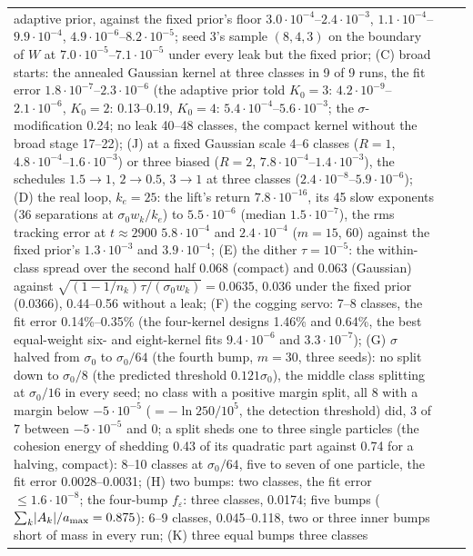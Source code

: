 {\begin{longtable}{@{}>{\raggedright\arraybackslash}p{}>{\raggedright\arraybackslash}p{}%
>{\raggedright\arraybackslash}p{}@{}}
  adaptive prior, against the fixed prior's floor $3.0\cdot10^{-4}$--$2.4\cdot10^{-3}$,
  $1.1\cdot10^{-4}$--$9.9\cdot10^{-4}$, $4.9\cdot10^{-6}$--$8.2\cdot10^{-5}$; seed 3's sample $(8,4,3)$ on the boundary
  of $W$ at $7.0\cdot10^{-5}$--$7.1\cdot10^{-5}$ under every leak but the fixed prior; (C) broad starts: the annealed
  Gaussian kernel at three classes in 9 of 9 runs, the fit error $1.8\cdot10^{-7}$--$2.3\cdot10^{-6}$ (the adaptive
  prior told $K_0 = 3$: $4.2\cdot10^{-9}$--$2.1\cdot10^{-6}$, $K_0 = 2$: 0.13--0.19, $K_0 = 4$:
  $5.4\cdot10^{-4}$--$5.6\cdot10^{-3}$; the $\sigma$-modification 0.24; no leak 40--48 classes, the compact kernel
  without the broad stage 17--22); (J) at a fixed Gaussian scale 4--6 classes ($R = 1$,
  $4.8\cdot10^{-4}$--$1.6\cdot10^{-3}$) or three biased ($R = 2$, $7.8\cdot10^{-4}$--$1.4\cdot10^{-3}$), the schedules
  $1.5\to1$, $2\to0.5$, $3\to1$ at three classes ($2.4\cdot10^{-8}$--$5.9\cdot10^{-6}$); (D) the real loop, $k_e = 25$:
  the lift's return $7.8\cdot10^{-16}$, its 45 slow exponents (36 separations at $\sigma_0w_k/k_e$) to
  $5.5\cdot10^{-6}$ (median $1.5\cdot10^{-7}$), the rms tracking error at $t\approx2900$ $5.8\cdot10^{-4}$ and
  $2.4\cdot10^{-4}$ ($m = 15$, $60$) against the fixed prior's $1.3\cdot10^{-3}$ and $3.9\cdot10^{-4}$; (E) the
  dither $\tau = 10^{-5}$: the within-class spread over the second half 0.068 (compact) and 0.063 (Gaussian) against
  $\sqrt{(1 - 1/n_k)\tau/(\sigma_0w_k)} = 0.0635$, 0.036 under the fixed prior (0.0366), 0.44--0.56 without a leak;
  (F) the cogging servo: 7--8 classes, the fit error 0.14\%--0.35\% (the four-kernel designs 1.46\% and 0.64\%, the
  best equal-weight six- and eight-kernel fits $9.4\cdot10^{-6}$ and $3.3\cdot10^{-7}$); (G) $\sigma$ halved from
  $\sigma_0$ to $\sigma_0/64$ (the fourth bump, $m = 30$, three seeds): no split down to $\sigma_0/8$ (the predicted
  threshold $0.121\sigma_0$), the middle class splitting at $\sigma_0/16$ in every seed; no class with a positive
  margin split, all 8 with a margin below $-5\cdot10^{-5}$ ($= -\ln250/10^5$, the detection threshold) did, 3 of 7
  between $-5\cdot10^{-5}$ and 0; a split sheds one to three single particles (the cohesion energy of shedding 0.43 of
  its quadratic part against 0.74 for a halving, compact): 8--10 classes at $\sigma_0/64$, five to seven of one
  particle, the fit error 0.0028--0.0031; (H) two bumps: two classes, the fit error $\le1.6\cdot10^{-8}$; the
  four-bump $f_\varepsilon$: three classes, 0.0174; five bumps ($\sum_k\lvert A_k\rvert/a_{\max} = 0.875$): 6--9 classes,
  0.045--0.118, two or three inner bumps short of mass in every run; (K) three equal bumps three classes

\end{longtable}}
